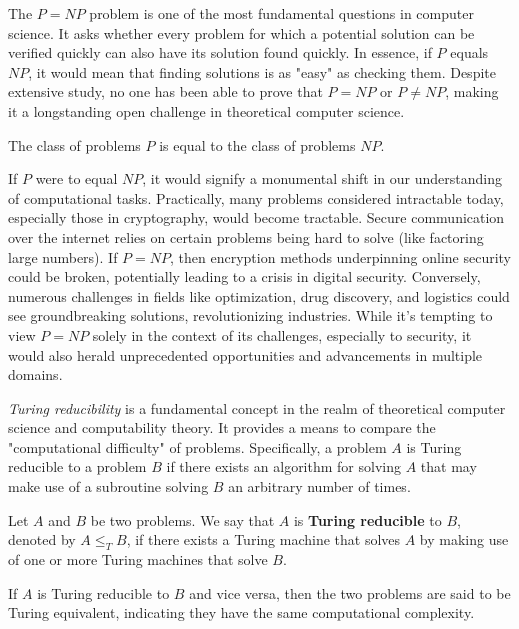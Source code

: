 The $P=NP$ problem is one of the most fundamental questions in computer science. It asks whether every problem for which a potential solution can be verified quickly can also have its solution found quickly. In essence, if $P$ equals $NP$, it would mean that finding solutions is as "easy" as checking them. Despite extensive study, no one has been able to prove that $P=NP$ or $P\neq NP$, making it a longstanding open challenge in theoretical computer science.

\begin{theorem}[P=NP Problem]
The class of problems $P$ is equal to the class of problems $NP$.
\end{theorem}

If $P$ were to equal $NP$, it would signify a monumental shift in our understanding of computational tasks. Practically, many problems considered intractable today, especially those in cryptography, would become tractable. Secure communication over the internet relies on certain problems being hard to solve (like factoring large numbers). If $P=NP$, then encryption methods underpinning online security could be broken, potentially leading to a crisis in digital security. Conversely, numerous challenges in fields like optimization, drug discovery, and logistics could see groundbreaking solutions, revolutionizing industries. While it's tempting to view $P=NP$ solely in the context of its challenges, especially to security, it would also herald unprecedented opportunities and advancements in multiple domains.

\emph{Turing reducibility} is a fundamental concept in the realm of theoretical computer science and computability theory. It provides a means to compare the "computational difficulty" of problems. Specifically, a problem $A$ is Turing reducible to a problem $B$ if there exists an algorithm for solving $A$ that may make use of a subroutine solving $B$ an arbitrary number of times.

\begin{definition}
Let $A$ and $B$ be two problems. We say that $A$ is \textbf{Turing reducible} to $B$, denoted by $A \leq_T B$, if there exists a Turing machine that solves $A$ by making use of one or more Turing machines that solve $B$.
\end{definition}

If $A$ is Turing reducible to $B$ and vice versa, then the two problems are said to be Turing equivalent, indicating they have the same computational complexity.

